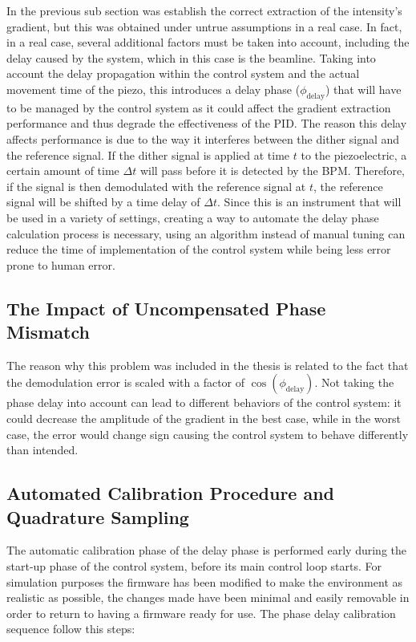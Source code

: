 In the previous sub section was establish the correct extraction of the intensity's gradient, but this was obtained under untrue assumptions in a real case.
In fact, in a real case, several additional factors must be taken into account, including the delay caused by the system, which in this case is the beamline.
Taking into account the delay propagation within the control system and the actual movement time of the piezo, this introduces a delay phase ($\phi_{\text{delay}}$) that will have to be managed by the control system as it could affect the gradient extraction performance and thus degrade the effectiveness of the PID.
The reason this delay affects performance is due to the way it interferes between the dither signal and the reference signal.
If the dither signal is applied at time $t$ to the piezoelectric, a certain amount of time $\Delta t$ will pass before it is detected by the BPM. Therefore, if the signal is then demodulated with the reference signal at $t$, the reference signal will be shifted by a time delay of $\Delta t$.
Since this is an instrument that will be used in a variety of settings, creating a way to automate the delay phase calculation process is necessary, using an algorithm instead of manual tuning can reduce the time of implementation of the control system while being less error prone to human error.

\subsection{The Impact of Uncompensated Phase Mismatch}

The reason why this problem was included in the thesis is related to the fact that the demodulation error is scaled with a factor of $\cos(\phi_{\text{delay}})$.
Not taking the phase delay into account can lead to different behaviors of the control system: it could decrease the amplitude of the gradient in the best case, while in the worst case, the error would change sign causing the control system to behave differently than intended.

\subsection{Automated Calibration Procedure and Quadrature Sampling}

The automatic calibration phase of the delay phase is performed early during the start-up phase of the control system, before its main control loop starts.
For simulation purposes the firmware has been modified to make the environment as realistic as possible, the changes made have been minimal and easily removable in order to return to having a firmware ready for use.
The phase delay calibration sequence follow this steps:


